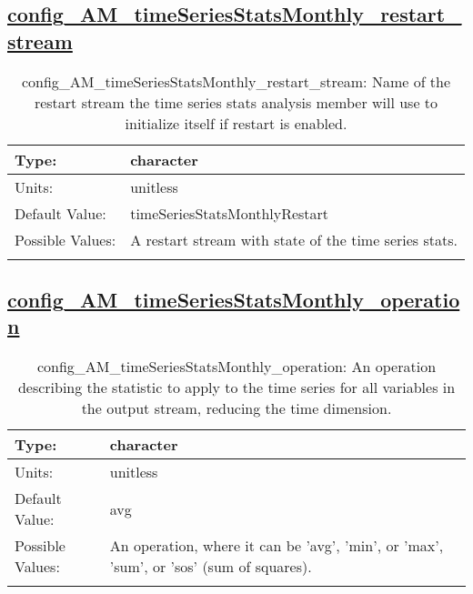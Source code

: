 \subsection[config\_AM\_timeSeriesStatsMonthly\_restart\_stream]{\hyperref[sec:nm_tab_AM_timeSeriesStatsMonthly]{config\_AM\_timeSeriesStatsMonthly\_restart\_stream}}
\label{subsec:nm_sec_config_AM_timeSeriesStatsMonthly_restart_stream}
\begin{center}
\begin{longtable}{| p{2.0in} || p{4.0in} |}
    \hline
    Type: & character \\
    \hline
    Units: & \si{unitless} \\
    \hline
    Default Value: & timeSeriesStatsMonthlyRestart \\
    \hline
    Possible Values: & A restart stream with state of the time series stats. \\
    \hline
    \caption{config\_AM\_timeSeriesStatsMonthly\_restart\_stream: Name of the restart stream the time series stats analysis member will use to initialize itself if restart is enabled.}
\end{longtable}
\end{center}
\subsection[config\_AM\_timeSeriesStatsMonthly\_operation]{\hyperref[sec:nm_tab_AM_timeSeriesStatsMonthly]{config\_AM\_timeSeriesStatsMonthly\_operation}}
\label{subsec:nm_sec_config_AM_timeSeriesStatsMonthly_operation}
\begin{center}
\begin{longtable}{| p{2.0in} || p{4.0in} |}
    \hline
    Type: & character \\
    \hline
    Units: & \si{unitless} \\
    \hline
    Default Value: & avg \\
    \hline
    Possible Values: & An operation, where it can be 'avg', 'min', or 'max', 'sum', or 'sos' (sum of squares). \\
    \hline
    \caption{config\_AM\_timeSeriesStatsMonthly\_operation: An operation describing the statistic to apply to the time series for all variables in the output stream, reducing the time dimension.}
\end{longtable}
\end{center}
